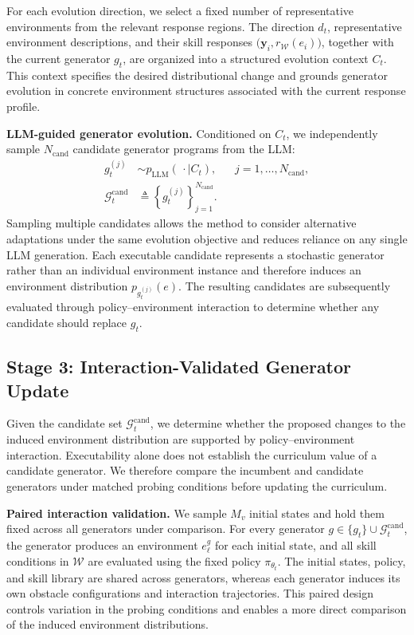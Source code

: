 \documentclass[conference]{IEEEtran}
\begin{document}
For each evolution direction, we select a fixed number of representative
environments from the relevant response regions. The direction $d_t$,
representative environment descriptions, and their skill responses
$\bigl(\mathbf y_i,r_{\mathcal W}(e_i)\bigr)$, together with the current
generator $g_t$, are organized into a structured evolution context $C_t$. This
context specifies the desired distributional change and grounds generator
evolution in concrete environment structures associated with the current
response profile.

\textbf{LLM-guided generator evolution.}
Conditioned on $C_t$, we independently sample $N_{\mathrm{cand}}$ candidate
generator programs from the LLM:
\begin{equation}
 \begin{aligned}
  g_t^{(j)}
  &\sim p_{\mathrm{LLM}}\!\left(\,\cdot\mid C_t\right),
  &&j=1,\ldots,N_{\mathrm{cand}},\\
  \mathcal G_t^{\mathrm{cand}}
  &\triangleq
  \left\{g_t^{(j)}\right\}_{j=1}^{N_{\mathrm{cand}}}.
 \end{aligned}
 \label{eq:candidate-generators}
\end{equation}
Sampling multiple candidates allows the method to consider alternative
adaptations under the same evolution objective and reduces reliance on any
single LLM generation. Each executable candidate represents a stochastic
generator rather than an individual environment instance and therefore induces
an environment distribution $p_{g_t^{(j)}}(e)$. The resulting candidates are
subsequently evaluated through policy--environment interaction to determine
whether any candidate should replace $g_t$.

\subsection{Stage 3: Interaction-Validated Generator Update}
\label{sec:verification}
Given the candidate set $\mathcal G_t^{\mathrm{cand}}$, we determine whether the
proposed changes to the induced environment distribution are supported by
policy--environment interaction. Executability alone does not establish the
curriculum value of a candidate generator. We therefore compare the incumbent
and candidate generators under matched probing conditions before updating the
curriculum.

\textbf{Paired interaction validation.}
We sample $M_v$ initial states and hold them fixed across all generators under
comparison. For every generator
$g\in\{g_t\}\cup\mathcal G_t^{\mathrm{cand}}$, the generator produces an
environment $e_\ell^g$ for each initial state, and all skill conditions in
$\mathcal W$ are evaluated using the fixed policy $\pi_{\theta_t}$. The initial
states, policy, and skill library are shared across generators, whereas each
generator induces its own obstacle configurations and interaction trajectories.
This paired design controls variation in the probing conditions and enables a
more direct comparison of the induced environment distributions.
\end{document}
